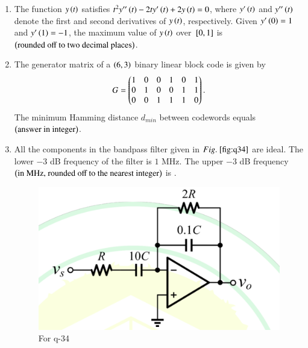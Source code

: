 \documentclass[journal,12pt,onecolumn]{IEEEtran}
\theoremstyle{remark}
\begin{document}
\begin{enumerate}
\begin{enumerate}
\end{enumerate}

\item The function $y\left(t\right)$ satisfies $t^2y''\left(t\right) - 2ty'\left(t\right) + 2y\left(t\right) = 0$, where $y'\left(t\right)$ and $y''\left(t\right)$ denote the first and second derivatives of $y\left(t\right)$, respectively. Given $y'\left(0\right) = 1$ and $y'\left(1\right) = -1$, the maximum value of $y\left(t\right)$ over ${}\left[0,1\right]$ is \underline{\hspace{2cm}} $\left(\text{rounded off to two decimal places}\right)$.

\hfill{}

\item The generator matrix of a $\left(6,3\right)$ binary linear block code is given by
\begin{align*}
    G = \begin{pmatrix}1 & 0 & 0 & 1 & 0 & 1 \\ 0 & 1 & 0 & 0 & 1 & 1 \\ 0 & 0 & 1 & 1 & 1 & 0\end{pmatrix}.
\end{align*} 
The minimum Hamming distance $d_{min}$ between codewords equals \underline{\hspace{2cm}} $\left(\text{answer in integer}\right)$.

\hfill{}

\item All the components in the bandpass filter given in $\figref{fig:q34}$ are ideal. The lower $-3$ dB frequency of the filter is $1$ MHz. The upper $-3$ dB frequency $\left(\text{in MHz, rounded off to the nearest integer}\right)$ is \underline{\hspace{2cm}}.
\begin{figure}[H]
\centering
\includegraphics[width=0.5\columnwidth]{q34}
\caption{For q-34}
\label{fig:q34}
\end{figure}


\end{enumerate}
\end{document}
